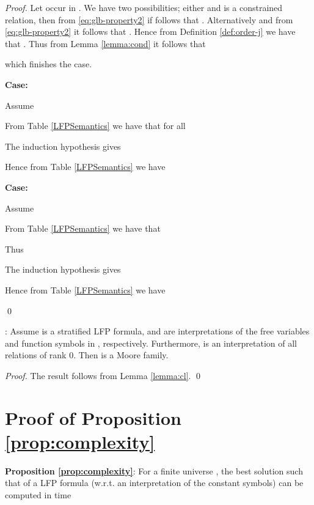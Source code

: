 \begin{proof}
Let  occur in . We have two possibilities; either
 and  is a constrained relation, then from
\eqref{eq:glb-property2} if follows that . Alternatively  and from
\eqref{eq:glb-property2} it follows that . Hence from Definition \ref{def:order-j} we have that
. Thus from Lemma \ref{lemma:cond} it
follows that

which finishes the case.

\noindent\textbf{Case: }

\noindent Assume

From Table \ref{LFPSemantics} we have that for all 

The induction hypothesis gives

Hence from Table \ref{LFPSemantics} we have


\noindent\textbf{Case: }

\noindent Assume

From Table \ref{LFPSemantics} we have that

Thus

The induction hypothesis gives

Hence from Table \ref{LFPSemantics} we have

\qed
\end{proof}

: Assume  is a
stratified LFP formula,  and  are
interpretations of the free variables and function symbols in ,
respectively. Furthermore,  is an interpretation of all
relations of rank 0. Then  is a Moore family.
\begin{proof}
The result follows from Lemma \ref{lemma:cl}.
\qed
\end{proof}

\section{Proof of Proposition
  \ref{prop:complexity}}\label{proof:prop:complexity}
{\bf Proposition \ref{prop:complexity}}:
For a finite universe , the best solution  such that
   of a LFP formula  (w.r.t. an interpretation of the constant symbols) can be
  computed in time

